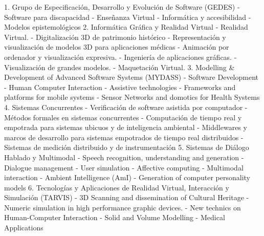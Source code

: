 1. Grupo de Especificación, Desarrollo y Evolución de Software (GEDES)
    - Software para discapacidad
    - Enseñanza Virtual
    - Informática y accesibilidad
    - Modelos epistemológicos
2. Informática Gráfica y Realidad Virtual
    - Realidad Virtual.
    - Digitalización 3D de patrimonio histórico
    - Representación y visualización de modelos 3D para aplicaciones médicas
    - Animación por ordenador y visualización expresiva.
    - Ingeniería de aplicaciones gráficas.
    - Visualización de grandes modelos.
    - Maquetación Virtual.
3. Modelling & Development of Advanced Software Systems (MYDASS)
    - Software Development
    - Human Computer Interaction
    - Assistive technologies
    - Frameworks and platforms for mobile systems
    - Sensor Networks and domotics for Health Systems
4. Sistemas Concurrentes
    - Verificación de software asistida por computador
    - Métodos formales en sistemas concurrentes
    - Computación de tiempo real y empotrada para sistemas ubicuos y de inteligencia ambiental
    - Middlewares y marcos de desarrollo para sistemas empotrados de tiempo real distribuidos
    - Sistemas de medición distribuido y de instrumentación    
5. Sistemas de Diálogo Hablado y Multimodal 
    - Speech recognition, understanding and generation
    - Dialogue management
    - User simulation
    - Affective computing
    - Multimodal interaction
    - Ambient Intelligence (AmI)
    - Generation of computer personality models
6. Tecnologías y Aplicaciones de Realidad Virtual, Interacción y Simulación (TARVIS)
    - 3D Scanning and dissemination of Cultural Heritage
    - Numeric simulation in high performance graphic devices.
    - New technics on Human-Computer Interaction
    - Solid and Volume Modelling
    - Medical Applications


